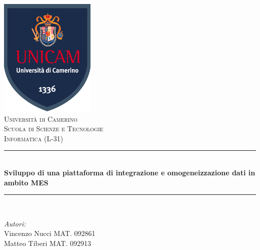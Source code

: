 \begin{titlepage}

\newcommand{\HRule}{\rule{\linewidth}{0.5mm}} %

\center %
 
\includegraphics{logo.png}\\[1cm] %
\textsc{\LARGE Università di Camerino}\\[1.5cm] %
\textsc{\Large Scuola di Scienze e Tecnologie}\\[0.5cm] %
\textsc{\large Informatica (L-31)}\\[0.5cm] %


\HRule \\[0.4cm]
{ \huge \bfseries Sviluppo di una piattaforma di integrazione e omogeneizzazione dati in ambito MES}\\[0.4cm] %
\HRule \\[1.5cm]
 

\begin{minipage}{0.4\textwidth}
\begin{flushleft} \large
\emph{Autori:}\\
Vincenzo Nucci MAT. 092861 \\
Matteo Tiberi MAT. 092913
\end{flushleft}
\end{minipage}



\end{titlepage}
